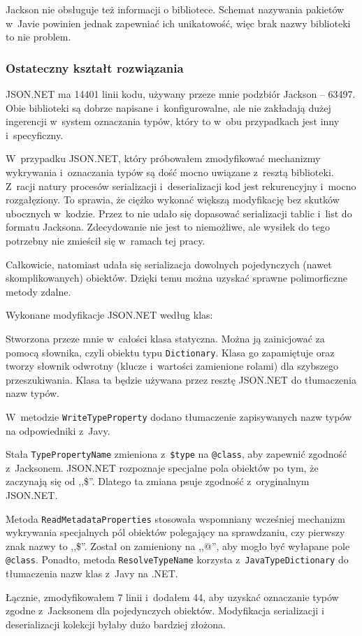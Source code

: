 Jackson nie obsługuje też informacji o bibliotece. Schemat nazywania pakietów w~Javie powinien jednak zapewniać ich unikatowość, więc brak nazwy biblioteki to nie problem.

\subsubsection{Ostateczny kształt rozwiązania}
JSON.NET ma 14401 linii kodu, używany przeze mnie podzbiór Jackson -- 63497. Obie biblioteki są dobrze napisane i~konfigurowalne, ale nie zakładają dużej ingerencji w~system oznaczania typów, który to w~obu przypadkach jest inny i~specyficzny.

W~przypadku JSON.NET, który próbowałem zmodyfikować mechanizmy wykrywania i~oznaczania typów są dość mocno uwiązane z~resztą biblioteki.
Z~racji natury procesów serializacji i~deserializacji kod jest rekurencyjny i~mocno rozgałęziony.
To sprawia, że ciężko wykonać większą modyfikację bez skutków ubocznych w~kodzie.
Przez to nie udało się dopasować serializacji tablic i~list do formatu Jacksona. Zdecydowanie nie jest to niemożliwe, ale wysiłek do tego potrzebny nie zmieścił się w~ramach tej pracy.

Całkowicie, natomiast udała się serializacja dowolnych pojedynczych (nawet skomplikowanych) obiektów. Dzięki temu można uzyskać sprawne polimorficzne metody zdalne.

Wykonane modyfikacje JSON.NET według klas:
\begin{description}
Stworzona przeze mnie w~całości klasa statyczna. Można ją zainicjować za pomocą słownika, czyli obiektu typu \texttt{Dictionary}. Klasa go zapamiętuje oraz tworzy słownik odwrotny (klucze i~wartości zamienione rolami) dla szybszego przeszukiwania. Klasa ta będzie używana przez resztę JSON.NET do tłumaczenia nazw typów.

W~metodzie \texttt{WriteTypeProperty} dodano tłumaczenie zapisywanych nazw typów na odpowiedniki z~Javy.

Stała \texttt{TypePropertyName} zmieniona z~\texttt{\$type} na \texttt{@class}, aby zapewnić zgodność z~Jacksonem. JSON.NET rozpoznaje specjalne pola obiektów po tym, że zaczynają się od ,,\$''. Dlatego ta zmiana psuje zgodność z~oryginalnym JSON.NET.

Metoda \texttt{ReadMetadataProperties} stosowała wspomniany wcześniej mechanizm wykrywania specjalnych pól obiektów polegający na sprawdzaniu, czy  pierwszy znak nazwy to ,,\$''. Został on zamieniony na ,,@'', aby mogło być wyłapane pole \texttt{@class}. Ponadto, metoda \texttt{ResolveTypeName} korzysta z~\texttt{JavaTypeDictionary} do tłumaczenia nazw klas z~Javy na .NET.
\end{description}
Łącznie, zmodyfikowałem 7 linii i~dodałem 44, aby uzyskać oznaczanie typów zgodne z~Jacksonem dla pojedynczych obiektów.
Modyfikacja serializacji i deserializacji kolekcji byłaby dużo bardziej złożona.

